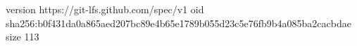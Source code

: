 version https://git-lfs.github.com/spec/v1
oid sha256:b0f431da0a865aed207bc89e4b65e1789b055d23c5e76fb9b4a085ba2cacbdae
size 113
